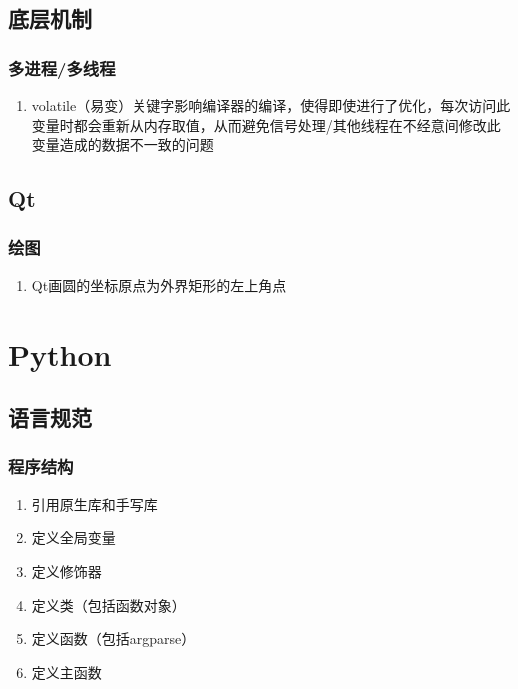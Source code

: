\documentclass[onecolumn]{article}
\begin{document}
    \subsection{底层机制}
        \subsubsection{多进程/多线程}
            \noindent
            \begin{enumerate}
                \item volatile（易变）关键字影响编译器的编译，使得即使进行了优化，每次访问此变量时都会重新从内存取值，从而避免信号处理/其他线程在不经意间修改此变量造成的数据不一致的问题
            \end{enumerate}
    \subsection{Qt}
        \subsubsection{绘图}
            \noindent
            \begin{enumerate}
                \item Qt画圆的坐标原点为外界矩形的左上角点
            \end{enumerate}      
\newpage
\section{Python}
    \subsection{语言规范}
        \subsubsection{程序结构}
            \noindent
            \begin{enumerate}
                \item 引用原生库和手写库
                \item 定义全局变量
                \item 定义修饰器
                \item 定义类（包括函数对象）
                \item 定义函数（包括argparse）
                \item 定义主函数
            \end{enumerate}
\end{document}
